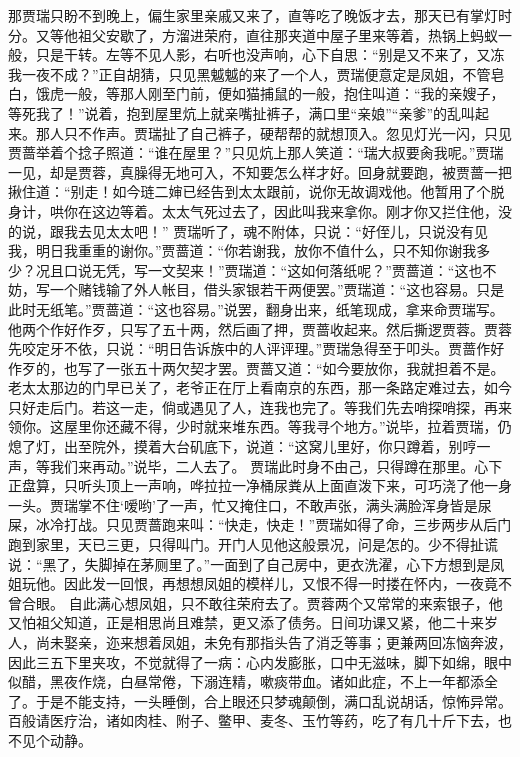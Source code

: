 \documentclass[12pt,oneside]{book}
\begin{document}
那贾瑞只盼不到晚上，偏生家里亲戚又来了，直等吃了晚饭才去，那天已有掌灯时分。又等他祖父安歇了，方溜进荣府，直往那夹道中屋子里来等着，热锅上蚂蚁一般，只是干转。左等不见人影，右听也没声响，心下自思：“别是又不来了，又冻我一夜不成？”正自胡猜，只见黑魆魆的来了一个人，贾瑞便意定是凤姐，不管皂白，饿虎一般，等那人刚至门前，便如猫捕鼠的一般，抱住叫道：“我的亲嫂子，等死我了！”说着，抱到屋里炕上就亲嘴扯裤子，满口里“亲娘”“亲爹”的乱叫起来。那人只不作声。贾瑞扯了自己裤子，硬帮帮的就想顶入。忽见灯光一闪，只见贾蔷举着个捻子照道：“谁在屋里？”只见炕上那人笑道：“瑞大叔要肏我呢。”贾瑞一见，却是贾蓉，真臊得无地可入，不知要怎么样才好。回身就要跑，被贾蔷一把揪住道：“别走！如今琏二婶已经告到太太跟前，说你无故调戏他。他暂用了个脱身计，哄你在这边等着。太太气死过去了，因此叫我来拿你。刚才你又拦住他，没的说，跟我去见太太吧！”
贾瑞听了，魂不附体，只说：“好侄儿，只说没有见我，明日我重重的谢你。”贾蔷道：“你若谢我，放你不值什么，只不知你谢我多少？况且口说无凭，写一文契来！”贾瑞道：“这如何落纸呢？”贾蔷道：“这也不妨，写一个赌钱输了外人帐目，借头家银若干两便罢。”贾瑞道：“这也容易。只是此时无纸笔。”贾蔷道：“这也容易。”说罢，翻身出来，纸笔现成，拿来命贾瑞写。他两个作好作歹，只写了五十两，然后画了押，贾蔷收起来。然后撕逻贾蓉。贾蓉先咬定牙不依，只说：“明日告诉族中的人评评理。”贾瑞急得至于叩头。贾蔷作好作歹的，也写了一张五十两欠契才罢。贾蔷又道：“如今要放你，我就担着不是。老太太那边的门早已关了，老爷正在厅上看南京的东西，那一条路定难过去，如今只好走后门。若这一走，倘或遇见了人，连我也完了。等我们先去哨探哨探，再来领你。这屋里你还藏不得，少时就来堆东西。等我寻个地方。”说毕，拉着贾瑞，仍熄了灯，出至院外，摸着大台矶底下，说道：“这窝儿里好，你只蹲着，别哼一声，等我们来再动。”说毕，二人去了。
贾瑞此时身不由己，只得蹲在那里。心下正盘算，只听头顶上一声响，哗拉拉一净桶尿粪从上面直泼下来，可巧浇了他一身一头。贾瑞掌不住‘嗳哟’了一声，忙又掩住口，不敢声张，满头满脸浑身皆是尿屎，冰冷打战。只见贾蔷跑来叫：“快走，快走！”贾瑞如得了命，三步两步从后门跑到家里，天已三更，只得叫门。开门人见他这般景况，问是怎的。少不得扯谎说：“黑了，失脚掉在茅厕里了。”一面到了自己房中，更衣洗濯，心下方想到是凤姐玩他。因此发一回恨，再想想凤姐的模样儿，又恨不得一时搂在怀内，一夜竟不曾合眼。
自此满心想凤姐，只不敢往荣府去了。贾蓉两个又常常的来索银子，他又怕祖父知道，正是相思尚且难禁，更又添了债务。日间功课又紧，他二十来岁人，尚未娶亲，迩来想着凤姐，未免有那指头告了消乏等事；更兼两回冻恼奔波，因此三五下里夹攻，不觉就得了一病：心内发膨胀，口中无滋味，脚下如绵，眼中似醋，黑夜作烧，白昼常倦，下溺连精，嗽痰带血。诸如此症，不上一年都添全了。于是不能支持，一头睡倒，合上眼还只梦魂颠倒，满口乱说胡话，惊怖异常。百般请医疗治，诸如肉桂、附子、鳖甲、麦冬、玉竹等药，吃了有几十斤下去，也不见个动静。
\end{document}
